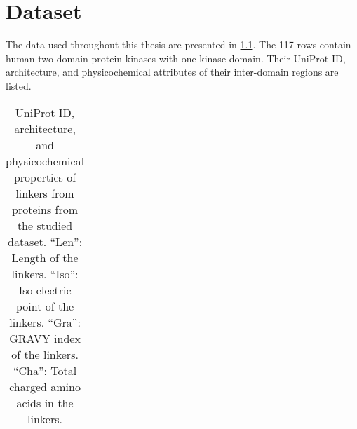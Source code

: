 \chapter{Dataset}

The data used throughout this thesis are presented in \cref{table:dataset}.
The 117 rows contain human two-domain protein kinases with one kinase domain.
Their UniProt ID, architecture, and physicochemical attributes of their inter-domain
regions are listed.

\begin{longtable}[c]{||r|r|r|r|r|r||}
  \caption{UniProt ID, architecture, and physicochemical properties of linkers from
  proteins from the studied dataset.
  ``Len'': Length of the linkers.
  ``Iso'': Iso-electric point of the linkers.
  ``Gra'': GRAVY index of the linkers.
  ``Cha'': Total charged amino acids in the linkers.}
  \label{table:dataset} \\


\end{longtable}
